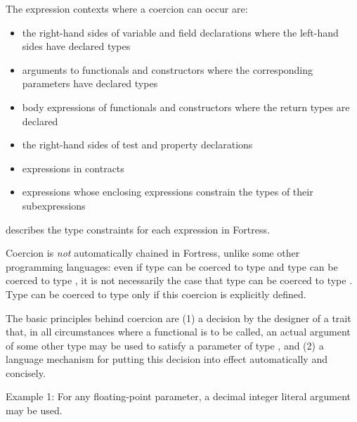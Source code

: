 The expression contexts where a coercion can occur are:
\begin{itemize}
\item the right-hand sides of variable and field declarations where the
  left-hand sides have declared types
\item arguments to functionals and constructors where the corresponding
  parameters have declared types
\item body expressions of functionals and constructors where the return
  types are declared
\item the right-hand sides of test and property declarations
\item expressions in contracts
\item expressions whose enclosing expressions constrain the types of
  their subexpressions
\end{itemize}
 describes the type constraints for each expression in
Fortress.


Coercion is \emph{not} automatically chained in Fortress, unlike some
other programming languages: even if type  can be coerced to
type  and type  can be coerced to type , it is
not necessarily the case that type  can be coerced to type
.  Type  can be coerced to type  only if this
coercion is explicitly defined.

The basic principles behind coercion are (1) a decision by the
designer of a trait  that, in all circumstances where a
functional is to be called, an actual argument of some other type
 may be used to satisfy a parameter of type
, and (2) a language mechanism for putting this decision into
effect automatically and concisely.

Example 1: For any floating-point parameter, a decimal integer literal
argument may be used.

